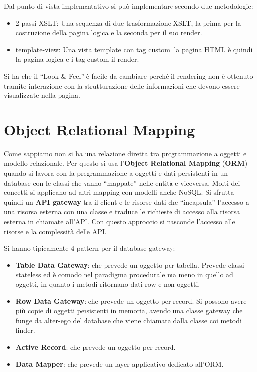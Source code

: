 \begin{itemize}
          Dal punto di vista implementativo si può implementare secondo due metodologie:
          \begin{itemize}
              \item 2 passi XSLT: Una sequenza di due trasformazione XSLT, la prima per la
                    costruzione della pagina logica e la seconda per il suo render.
              \item template-view: Una vista template con tag custom, la pagina HTML è quindi
                    la pagina logica e i tag custom il render.
          \end{itemize}
          Si ha che il “Look \& Feel” è facile da cambiare perché il rendering
          non è ottenuto tramite interazione con la strutturazione delle informazioni
          che devono essere visualizzate nella pagina.
\end{itemize}
\section{Object Relational Mapping}
Come sappiamo non si ha una relazione diretta tra programmazione a oggetti e
modello relazionale. Per questo si usa l'\textbf{Object Relational Mapping}
(\textbf{ORM}) quando si lavora con la programmazione a oggetti e dati persistenti
in un database con le classi che vanno “mappate” nelle entità e viceversa. Molti
dei concetti si applicano ad altri mapping con modelli anche NoSQL. Si sfrutta
quindi un \textbf{API gateway} tra il client e le risorse dati che “incapsula”
l'accesso a una risorsa esterna con una classe e traduce le richieste di accesso
alla risorsa esterna in chiamate all'API. Con questo approccio si nasconde l'accesso
alle risorse e la complessità delle API.

Si hanno tipicamente 4 pattern per il database gateway:
\begin{itemize}
    \item \textbf{Table Data Gateway}: che prevede un oggetto per tabella. Prevede
          classi stateless ed è comodo nel paradigma procedurale ma meno in quello ad
          oggetti, in quanto i metodi ritornano dati row e non oggetti.
    \item \textbf{Row Data Gateway}: che prevede un oggetto per record. Si possono
          avere più copie di oggetti persistenti in memoria, avendo una classe gateway
          che funge da alter-ego del database che viene chiamata dalla classe coi metodi finder.
    \item \textbf{Active Record}: che prevede un oggetto per record.
    \item \textbf{Data Mapper}: che prevede un layer applicativo dedicato all'ORM.
\end{itemize}
